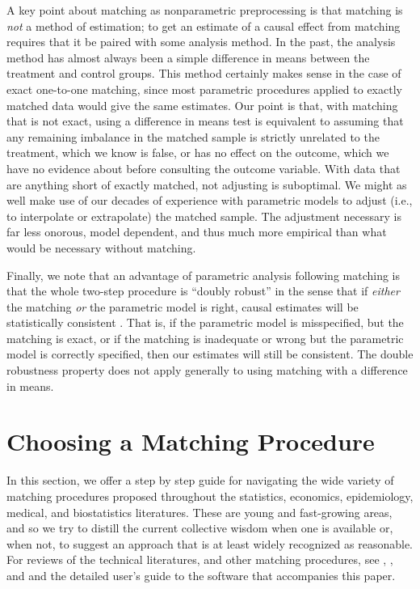 \documentclass[11pt,titlepage]{article}
\begin{document}
A key point about matching as nonparametric preprocessing is that
matching is \emph{not} a method of estimation; to get an estimate of a
causal effect from matching requires that it be paired with some
analysis method.  In the past, the analysis method has almost always
been a simple difference in means between the treatment and control
groups.  This method certainly makes sense in the case of exact
one-to-one matching, since most parametric procedures applied to
exactly matched data would give the same estimates.  Our point is
that, with matching that is not exact, using a difference in means
test is equivalent to assuming that any remaining imbalance in the
matched sample is strictly unrelated to the treatment, which we know
is false, or has no effect on the outcome, which we have no evidence
about before consulting the outcome variable.  With data that are
anything short of exactly matched, not adjusting is suboptimal.  We
might as well make use of our decades of experience with parametric
models to adjust (i.e., to interpolate or extrapolate) the matched
sample.  The adjustment necessary is far less onorous, model
dependent, and thus much more empirical than what would be necessary
without matching.  

Finally, we note that an advantage of parametric analysis following
matching is that the whole two-step procedure is ``doubly robust'' in
the sense that if \emph{either} the matching \emph{or} the parametric
model is right, causal estimates will be statistically consistent
\citep[see][]{RobRot01}.  That is, if the parametric model is
misspecified, but the matching is exact, or if the matching is
inadequate or wrong but the parametric model is correctly specified,
then our estimates will still be consistent.  The double robustness
property does not apply generally to using matching with a difference
in means.


\section{Choosing a Matching Procedure}\label{s:choose}

In this section, we offer a step by step guide for navigating the wide
variety of matching procedures proposed throughout the statistics,
economics, epidemiology, medical, and biostatistics literatures.
These are young and fast-growing areas, and so we try to distill the
current collective wisdom when one is available or, when not, to
suggest an approach that is at least widely recognized as reasonable.
For reviews of the technical literatures, and other matching
procedures, see \citet{Imbens04}, \citet{Rosenbaum02}, and
\citet{Stuart04} and the detailed user's guide to the software that
accompanies this paper.%
\end{document}
